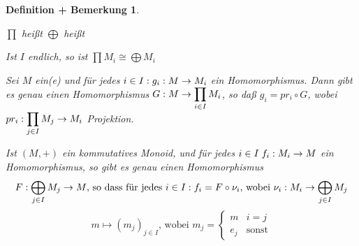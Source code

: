 \documentclass[a4paper,10pt,german]{scrbook}
\theoremstyle{saetze}
\theoremstyle{definitionen}
\newtheorem{DefBem}[Def]{Definition + Bemerkung}
\begin{document}
\begin{DefBem}
\mbox{}
\begin{enum}
\item $\prod$ heißt  \newline
$\bigoplus$ heißt 
\item Ist $I$ endlich, so ist $\prod M_i \cong \bigoplus M_i$
\item Sei $M$ ein(e) \bla und für jedes $i \in I: g_i:M \rightarrow
M_i$ ein Homomorphismus. Dann gibt es genau einen Homomorphismus
$\displaystyle G:M \rightarrow \prod_{i \in I} M_i$, so daß $g_i = pr_i
\circ G$, wobei $\displaystyle pr_i: \prod_{j \in I} M_j \rightarrow M_i$
Projektion.


\item Ist $(M,+)$ ein kommutatives Monoid, und für jedes $i \in I\; f_i:M_i
\rightarrow M$ ein Homomorphismus, so gibt es genau einen Homomorphismus \[
F: \bigoplus_{j\in I} M_j \rightarrow M \mbox{, so dass für jedes } i \in I: f_i = F
\circ \nu_i \mbox{, wobei } \nu_i:M_i \rightarrow \bigoplus_{j\in I} M_j\] \[m \mapsto
(m_j)_{j \in I}\mbox{, wobei } m_j = \left\{
\begin{array}{rl}
            m & i=j \\
            e_j & \mbox{sonst}
          \end{array}\right.\]




\end{enum}
\end{DefBem}
\end{document}
